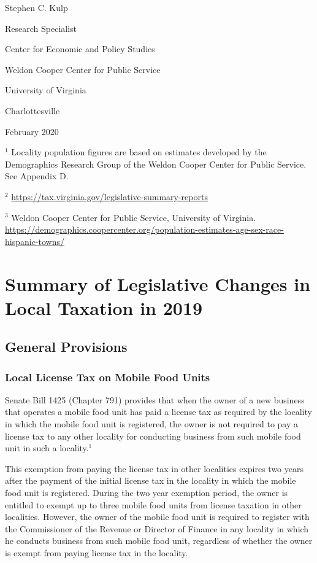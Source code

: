 \documentclass[
]{book}
\begin{document}
Stephen C. Kulp

Research Specialist

Center for Economic and Policy Studies

Weldon Cooper Center for Public Service

University of Virginia

Charlottesville

February 2020

\(^1\) Locality population figures are based on estimates developed by the Demographics Research Group of the Weldon Cooper Center for Public Service. See Appendix D.

\(^2\) \url{https://tax.virginia.gov/legislative-summary-reports}

\(^3\) Weldon Cooper Center for Public Service, University of Virginia. \url{https://demographics.coopercenter.org/population-estimates-age-sex-race-hispanic-towns/}

\hypertarget{summary-of-legislative-changes-in-local-taxation-in-2019}{%
\chapter{Summary of Legislative Changes in Local Taxation in 2019}\label{summary-of-legislative-changes-in-local-taxation-in-2019}}

\hypertarget{general-provisions}{%
\section{General Provisions}\label{general-provisions}}

\hypertarget{local-license-tax-on-mobile-food-units}{%
\subsection{Local License Tax on Mobile Food Units}\label{local-license-tax-on-mobile-food-units}}

Senate Bill 1425 (Chapter 791) provides that when the owner of a new business that operates a mobile food unit has paid a license tax as required by the locality in which the mobile food unit is registered, the owner is not required to pay a license tax to any other locality for conducting business from such mobile food unit in such a locality.\(^1\)

This exemption from paying the license tax in other localities expires two years after the payment of the initial license tax in the locality in which the mobile food unit is registered. During the two year exemption period, the owner is entitled to exempt up to three mobile food units from license taxation in other localities. However, the owner of the mobile food unit is required to register with the Commissioner of the Revenue or Director of Finance in any locality in which he conducts business from such mobile food unit, regardless of whether the owner is exempt from paying license tax in the locality.
\end{document}
